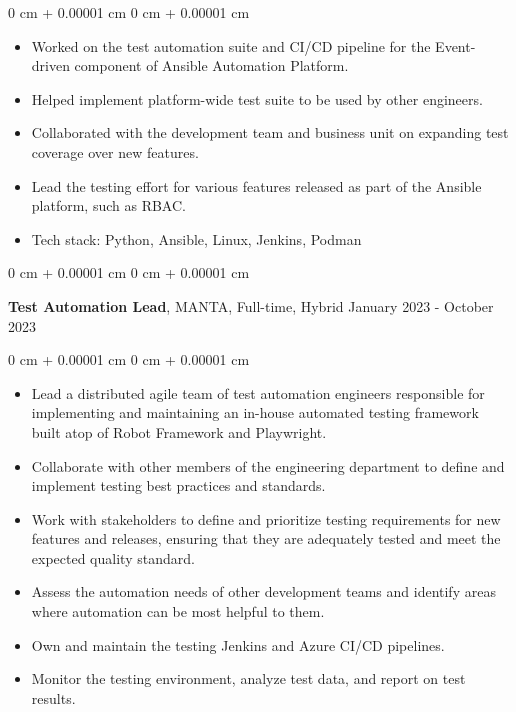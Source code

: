\documentclass[10pt, letterpaper]{article}
\newenvironment{highlights}{
    \begin{itemize}[
        topsep=0.10 cm,
        parsep=0.10 cm,
        partopsep=0pt,
        itemsep=0pt,
        leftmargin=0 cm + 10pt
    ]
}{
    \end{itemize}
} %
\newenvironment{onecolentry}{
    \begin{adjustwidth}{
        0 cm + 0.00001 cm
    }{
        0 cm + 0.00001 cm
    }
}{
    \end{adjustwidth}
} %
\newenvironment{twocolentry}[2][]{
    \onecolentry
    \def\secondColumn{#2}
    \setcolumnwidth{\fill, 4.5 cm}
    \begin{paracol}{2}
}{
    \switchcolumn \raggedleft \secondColumn
    \end{paracol}
    \endonecolentry
} %
\begin{document}
        \begin{onecolentry}
            \begin{highlights}
                \item Worked on the test automation suite and CI/CD pipeline for the Event-driven component of Ansible Automation Platform.
                \item Helped implement platform-wide test suite to be used by other engineers.
                \item Collaborated with the development team and business unit on expanding test coverage over new features.
                \item Lead the testing effort for various features released as part of the Ansible platform, such as RBAC.
                \item Tech stack: Python, Ansible, Linux, Jenkins, Podman
            \end{highlights}
        \end{onecolentry}

        \vspace{0.2 cm}

        \begin{twocolentry}{
            January 2023 - October 2023
        }
            \textbf{Test Automation Lead}, MANTA, Full-time, Hybrid\end{twocolentry}

        \vspace{0.10 cm}
        \begin{onecolentry}
            \begin{highlights}
                \item Lead a distributed agile team of test automation engineers responsible for implementing and maintaining an in-house automated testing framework built atop of Robot Framework and Playwright.
                \item Collaborate with other members of the engineering department to define and implement testing best practices and standards.
                \item Work with stakeholders to define and prioritize testing requirements for new features and releases, ensuring that they are adequately tested and meet the expected quality standard.
                \item Assess the automation needs of other development teams and identify areas where automation can be most helpful to them.
                \item Own and maintain the testing Jenkins and Azure CI/CD pipelines.
                \item Monitor the testing environment, analyze test data, and report on test results.
            \end{highlights}
        \end{onecolentry}
\end{document}
